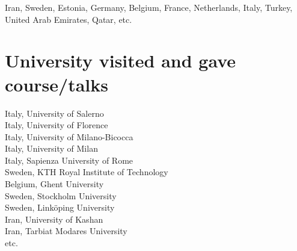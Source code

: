 \documentclass[a4paper,10pt]{article}
\begin{document}
Iran, Sweden, Estonia, Germany, Belgium, France, Netherlands, Italy, Turkey, United Arab Emirates, Qatar, etc.

\section{\textbf{University visited and gave course/talks}}
Italy, University of Salerno\\
Italy, University of Florence\\
Italy, University of Milano-Bicocca\\
Italy, University of Milan\\
Italy, Sapienza University of Rome\\
Sweden, KTH Royal Institute of Technology\\
Belgium, Ghent University\\
Sweden, Stockholm University\\
Sweden, Linköping University\\
Iran, University of Kashan\\
Iran, Tarbiat Modares University\\
etc.

\end{document}
